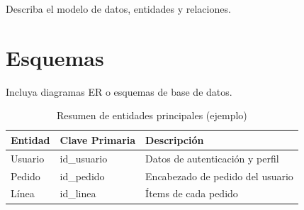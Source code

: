Describa el modelo de datos, entidades y relaciones.
\section*{Esquemas}
Incluya diagramas ER o esquemas de base de datos.


\begin{table}[H]
  \centering
  \caption{Resumen de entidades principales (ejemplo)}
  \label{tab:entidades}
  \begin{tabular}{@{}lll@{}}
    \toprule
    Entidad & Clave Primaria & Descripción \\
    \midrule
    Usuario & id\_usuario & Datos de autenticación y perfil \\
    Pedido  & id\_pedido  & Encabezado de pedido del usuario \\
    Línea   & id\_linea   & Ítems de cada pedido \\
    \bottomrule
  \end{tabular}
\end{table}
